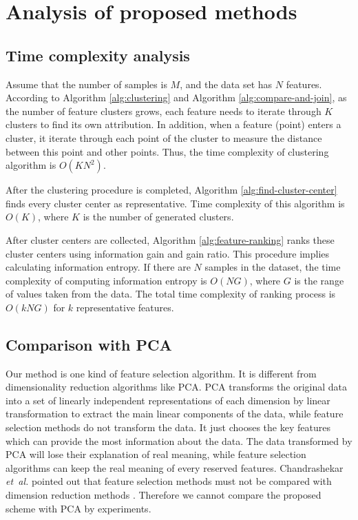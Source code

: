 \documentclass{ieeeaccess}
\theoremstyle{definition}
\begin{document}
\section{Analysis of proposed methods}
\label{sec:analysis}

\subsection{Time complexity analysis}

Assume that the number of samples is $M$, and the data set has $N$ features. According to Algorithm \ref{alg:clustering} and Algorithm \ref{alg:compare-and-join}, as the number of feature clusters grows, each feature needs to iterate through $K$ clusters to find its own attribution. In addition, when a feature (point) enters a cluster, it iterate through each point of the cluster to measure the distance between this point and other points. Thus, the time complexity of clustering algorithm is $O(KN^2)$. 

After the clustering procedure is completed, Algorithm \ref{alg:find-cluster-center} finds every cluster center as representative. Time complexity of this algorithm is $O(K)$, where $K$ is the number of generated clusters. 

After cluster centers are collected, Algorithm \ref{alg:feature-ranking} ranks these cluster centers using information gain and gain ratio. This procedure implies calculating information entropy. If there are $N$ samples in the dataset, the time complexity of computing information entropy is $O(NG)$, where $G$ is the range of values taken from the data. The total time complexity of ranking process is $O(kNG)$ for $k$ representative features.

\subsection{Comparison with PCA}

Our method is one kind of feature selection algorithm. It is different from dimensionality reduction algorithms like PCA\cite{PCA1987}. PCA transforms the original data into a set of linearly independent representations of each dimension by linear transformation to extract the main linear components of the data, while feature selection methods do not transform the data. It just chooses the key features which can provide the most information about the data. The data transformed by PCA will lose their explanation of real meaning, while feature selection algorithms can keep the real meaning of every reserved features. Chandrashekar \emph{et~al.} pointed out that feature selection methods must not be compared with dimension reduction methods \cite{Chandrashekar2014}. Therefore we cannot compare the proposed scheme with PCA by experiments.
\end{document}
